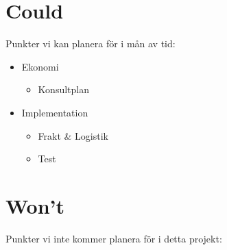 \section*{Could}
Punkter vi kan planera för i mån av tid:

\begin{itemize}[noitemsep]
    \item Ekonomi
    \begin{itemize}[noitemsep]
        \item Konsultplan
    \end{itemize}
    \item Implementation
    \begin{itemize}[noitemsep]
        \item Frakt \& Logistik
        \item Test
    \end{itemize}
\end{itemize}

\section*{Won't}
Punkter vi inte kommer planera för i detta projekt:
